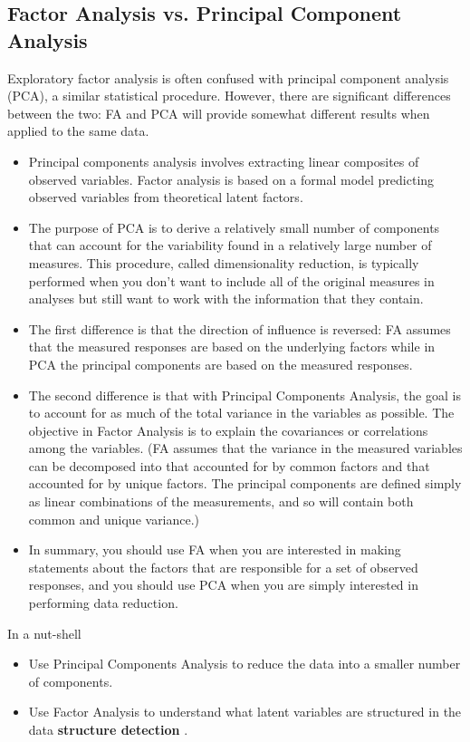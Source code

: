 \subsection{Factor Analysis vs. Principal Component Analysis}
Exploratory factor analysis is often confused with principal component analysis (PCA), a similar
statistical procedure. However, there are significant differences between the two: FA and PCA
will provide somewhat different results when applied to the same data.
\begin{itemize}
\item Principal components analysis involves extracting linear composites of observed variables. Factor analysis is based on a formal model predicting observed variables from theoretical latent factors.

\item The purpose of PCA is to derive a relatively small number of components that can account for the
variability found in a relatively large number of measures. This procedure, called dimensionality reduction, is
typically performed when you don't want to include all of the original measures in analyses
but still want to work with the information that they contain.

\item The first difference is that the direction of
influence is reversed: FA assumes that the measured responses are based on the underlying factors
while in PCA the principal components are based on the measured responses.

\item The second difference is that with Principal Components Analysis, the goal is to account for as much of the total variance in the variables as possible. The objective in Factor Analysis is to explain the covariances or correlations among the variables. (FA assumes that the variance in the measured variables can be decomposed into that accounted for by common factors and that accounted for by unique factors. The principal components are defined simply as linear combinations of the measurements, and so will contain both common and
    unique variance.)

\item In summary, you should use FA when you are interested in making statements about the factors that
are responsible for a set of observed responses, and you should use PCA when you are simply interested
in performing data reduction.
\end{itemize}

In a nut-shell
\begin{itemize}
\item Use Principal Components Analysis to reduce the data into a smaller number of components.
\item Use Factor Analysis to understand what latent variables are structured in the data \textbf{structure detection} .
\end{itemize}
